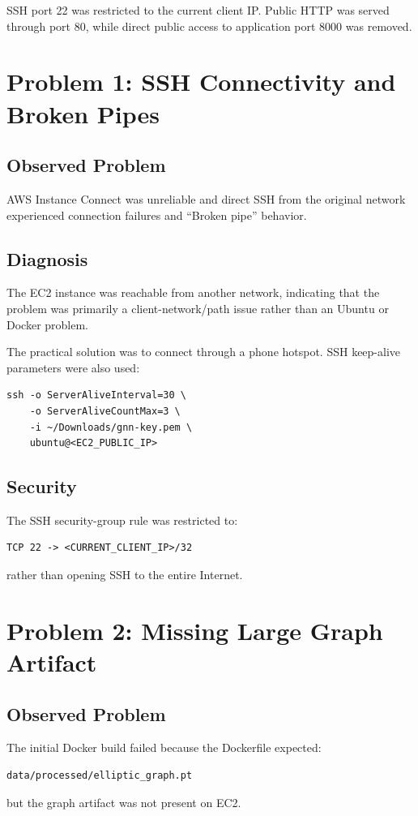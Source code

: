 \documentclass[11pt,a4paper]{article}
\begin{document}
SSH port 22 was restricted to the current client IP. Public HTTP was served through port 80, while direct public access to application port 8000 was removed.

\section{Problem 1: SSH Connectivity and Broken Pipes}
\subsection{Observed Problem}
AWS Instance Connect was unreliable and direct SSH from the original network experienced connection failures and ``Broken pipe'' behavior.

\subsection{Diagnosis}
The EC2 instance was reachable from another network, indicating that the problem was primarily a client-network/path issue rather than an Ubuntu or Docker problem.

The practical solution was to connect through a phone hotspot. SSH keep-alive parameters were also used:
\begin{lstlisting}
ssh -o ServerAliveInterval=30 \
    -o ServerAliveCountMax=3 \
    -i ~/Downloads/gnn-key.pem \
    ubuntu@<EC2_PUBLIC_IP>
\end{lstlisting}

\subsection{Security}
The SSH security-group rule was restricted to:
\begin{lstlisting}
TCP 22 -> <CURRENT_CLIENT_IP>/32
\end{lstlisting}
rather than opening SSH to the entire Internet.

\section{Problem 2: Missing Large Graph Artifact}
\subsection{Observed Problem}
The initial Docker build failed because the Dockerfile expected:
\begin{lstlisting}
data/processed/elliptic_graph.pt
\end{lstlisting}
but the graph artifact was not present on EC2.
\end{document}
